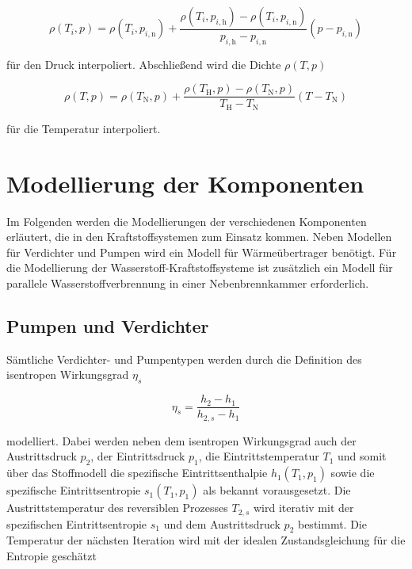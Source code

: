 \begin{equation}\label{Eq:pressure-interp}
	\rho(T_i, p)= \rho(T_i, p_{i,\mathrm{n}}) + \frac{\rho(T_i, p_{i,\mathrm{h}})-\rho(T_i, p_{i,\mathrm{n}})}{p_{i,\mathrm{h}}-p_{i,\mathrm{n}}}(p-p_{i,\mathrm{n}}) 
\end{equation}

für den Druck interpoliert. Abschließend wird die Dichte $\rho(T,p)$

\begin{equation}\label{Eq:temperature-interp}
	\rho(T, p)= \rho(T_\mathrm{N}, p) + \frac{\rho(T_\mathrm{H}, p)-\rho(T_\mathrm{N}, p)}{T_\mathrm{H}-T_\mathrm{N}}(T-T_\mathrm{N}) 
\end{equation}

für die Temperatur interpoliert. 


\section{Modellierung der Komponenten}

Im Folgenden werden die Modellierungen der verschiedenen Komponenten erläutert, die in den Kraftstoffsystemen zum Einsatz kommen. Neben Modellen für Verdichter und Pumpen wird ein Modell für Wärmeübertrager benötigt. Für die Modellierung der Wasserstoff-Kraftstoffsysteme ist zusätzlich ein Modell für parallele Wasserstoffverbrennung in einer Nebenbrennkammer erforderlich. 

\subsection{Pumpen und Verdichter}

Sämtliche Verdichter- und Pumpentypen werden durch die Definition des isentropen Wirkungsgrad $\eta_s$

\begin{equation}\label{Eq:isentropic}
	\eta_s=\frac{h_2-h_1}{h_{2,s}-h_1}
\end{equation}

modelliert. Dabei werden neben dem isentropen Wirkungsgrad auch der Austrittsdruck $p_2$, der Eintrittsdruck $p_1$, die Eintrittstemperatur $T_1$ und somit über das Stoffmodell die spezifische Eintrittsenthalpie $h_1(T_1, p_1)$ sowie die spezifische Eintrittsentropie $s_1(T_1, p_1)$ als bekannt vorausgesetzt. Die Austrittstemperatur des reversiblen Prozesses $T_{2,s}$ wird iterativ mit der spezifischen Eintrittsentropie $s_1$ und dem Austrittsdruck $p_2$ bestimmt. Die Temperatur der nächsten Iteration wird mit der idealen Zustandsgleichung für die Entropie geschätzt

